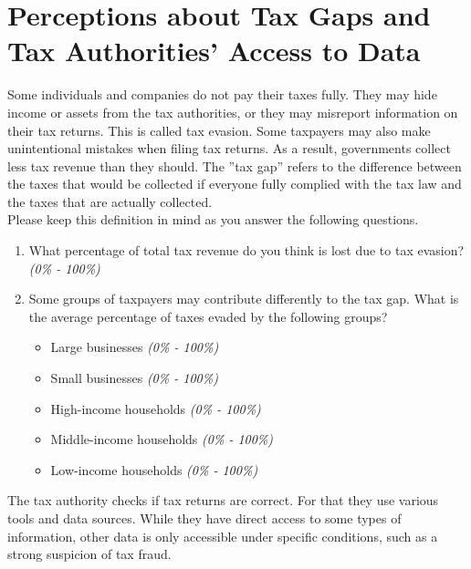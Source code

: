 \documentclass[11pt]{article}
\begin{document}
\section*{Perceptions about Tax Gaps and Tax Authorities' Access to Data}
Some individuals and companies do not pay their taxes fully. They may hide income or assets from the tax authorities, or they may misreport information on their tax returns. This is called tax evasion. Some taxpayers may also make unintentional mistakes when filing tax returns. As a result, governments collect less tax revenue than they should. The ”tax gap” refers to the difference between the taxes that would be collected if everyone fully complied with the tax law and the taxes that are actually collected.\\

\noindent Please keep this definition in mind as you answer the following questions. \\

\begin{enumerate}[resume]
    \item What percentage of total tax revenue do you think is lost due to tax evasion?\\
    \textit{(0\% - 100\%)}
    \item Some groups of taxpayers may contribute differently to the tax gap. What is the average percentage of taxes evaded by the following groups?
    \begin{itemize}
        \item Large businesses \textit{(0\% - 100\%)}
        \item Small businesses \textit{(0\% - 100\%)}
        \item High-income households \textit{(0\% - 100\%)}
        \item Middle-income households \textit{(0\% - 100\%)}
        \item Low-income households \textit{(0\% - 100\%)}
    \end{itemize}
\end{enumerate}

\vspace{1em}
\noindent
The tax authority checks if tax returns are correct. For that they use various tools and data sources. While they have direct access to some types of information, other data is only accessible under specific conditions, such as a strong suspicion of tax fraud.\\
\end{document}
